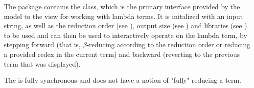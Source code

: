 The \texttt{} package contains the \texttt{}
class, which is the primary interface provided by the model to the view for working
with lambda terms. It is initalized with an input string, as well as the reduction
order (see \texttt{}), output size (see \texttt{})
and libraries (see \texttt{}) to be used and can then be used to
interactively operate on the lambda term, by stepping forward (that is, $\beta$-reducing
according to the reduction order or reducing a provided redex in the current term)
and backward (reverting to the previous term that was displayed).

The \texttt{} is fully synchronous and does not have a notion
of "fully" reducing a term.
